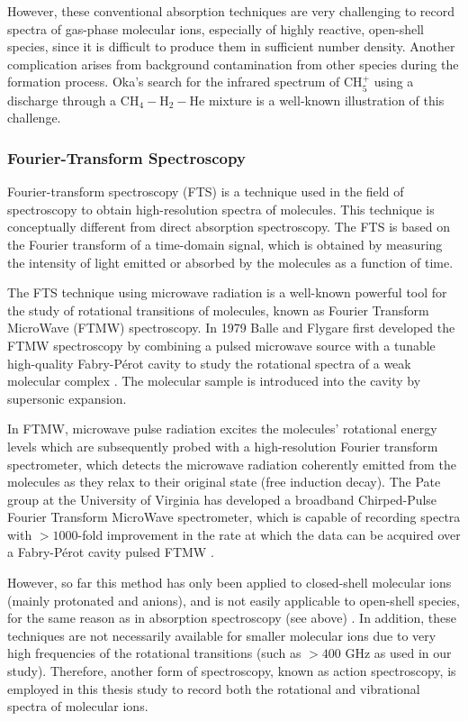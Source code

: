 However, these conventional absorption techniques are very challenging to
record spectra of gas-phase molecular ions, especially of highly reactive,
open-shell species, since it is difficult to produce them in sufficient
number density. Another complication arises from background contamination from
other species during the formation process. Oka's \cite{oka_taming_2015} search
for the infrared spectrum of CH$_5^+$ using a discharge through a
CH$_4-$H$_2-$He mixture is a well-known illustration of this challenge.

\subsubsection*{Fourier-Transform Spectroscopy}

Fourier-transform spectroscopy (FTS) is a technique used in the field of spectroscopy to obtain high-resolution spectra of molecules. This technique is conceptually different from direct absorption spectroscopy. 
The FTS is based on the Fourier transform of a time-domain signal, which is obtained by 
measuring the intensity of light emitted or absorbed by the molecules as a function of time.

The FTS technique using microwave radiation is a well-known powerful tool for the study of rotational transitions of molecules, known as Fourier Transform MicroWave (FTMW) spectroscopy. In 1979 Balle and Flygare first developed the FTMW spectroscopy by combining a pulsed microwave source with a tunable high-quality Fabry-P\'erot cavity to study the rotational spectra of a weak molecular complex \cite{balle_new_1979, balle_fabryperot_1981}. The molecular sample is introduced into the cavity by supersonic expansion.

In FTMW, microwave pulse radiation excites the molecules' rotational energy levels which are subsequently probed with a high-resolution Fourier transform spectrometer, which detects the microwave radiation coherently emitted from the molecules as they relax to their original state (free induction decay).
The Pate group at the University of Virginia has developed a broadband Chirped-Pulse Fourier Transform MicroWave  spectrometer, which is capable of recording spectra with $>1000$-fold improvement in the rate at which the data can be acquired over a Fabry-P\'erot cavity pulsed FTMW \cite{brown_rotational_2006, brown_broadband_2008, park_perspective_2016}.

However, so far this method has only been applied to closed-shell molecular ions (mainly protonated and anions), and is not easily applicable to open-shell species, for the same reason as in absorption spectroscopy (see above) \cite{gottlieb_rotational_2000, mccarthy_laboratory_2006, mccarthy_laboratory_2015}. In addition, these techniques are not necessarily available for smaller molecular ions due to very high frequencies of the rotational transitions (such as $>400$ GHz as used in our study).
Therefore, another form of spectroscopy, known as action spectroscopy, is employed in this thesis study to record both the rotational and vibrational spectra of molecular ions.

